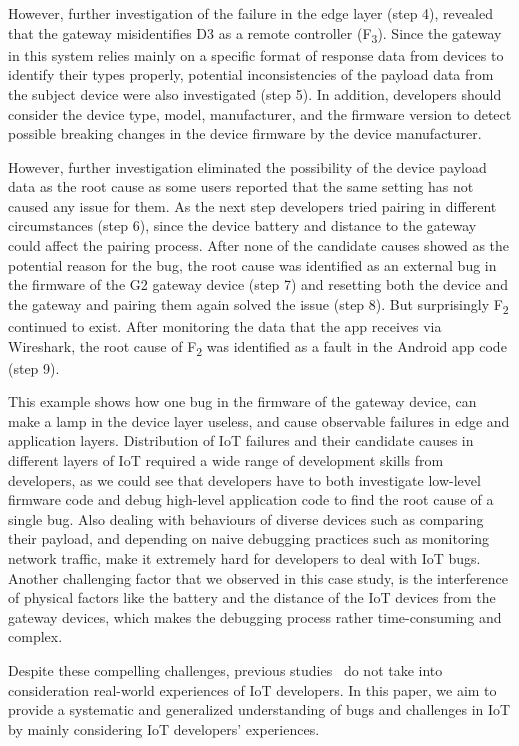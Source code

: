 However, further investigation of the failure in the edge layer (step 4), revealed that the gateway misidentifies D3 as a remote controller (F\textsubscript{3}). Since the gateway in this system relies mainly on a specific format of response data from devices to identify their types properly, potential inconsistencies of the payload data from the subject device were also investigated (step 5). In addition, developers should consider the device type, model, manufacturer, and the firmware version to detect possible breaking changes in the device firmware by the device manufacturer. 

However, further investigation eliminated the possibility of the device payload data as the root cause as some users reported that the same setting has not caused any issue for them. As the next step developers tried pairing in different circumstances (step 6), since the device battery and distance to the gateway could affect the pairing process. After none of the candidate causes showed as the potential reason for the bug, the root cause was identified as an external bug in the firmware of the G2 gateway device (step 7) and resetting both the device and the gateway and pairing them again solved the issue (step 8). But surprisingly F\textsubscript{2} continued to exist. After monitoring the data that the app receives via Wireshark, the root cause of F\textsubscript{2} was identified as a fault in the Android app code (step 9).

This example shows how one bug in the firmware of the gateway device, can make a lamp in the device layer useless, and cause observable failures in edge and application layers. Distribution of IoT failures and their candidate causes in different layers of IoT required a wide range of development skills from developers, as we could see that developers have to both investigate low-level firmware code and debug high-level application code to find the root cause of a single bug. Also dealing with behaviours of diverse devices such as comparing their payload, and depending on naive debugging practices such as monitoring network traffic, make it extremely hard for developers to deal with IoT bugs. Another challenging factor that we observed in this case study, is the interference of physical factors like the battery and the distance of the IoT devices from the gateway devices, which makes the debugging process rather time-consuming and complex.

Despite these compelling challenges, previous studies~\cite{hnat2011hitchhiker,corno2019challenges,stojkoska2017review,chen2017application,IoTOSBugs} do not take into consideration real-world experiences of IoT developers. In this paper, we aim to provide a systematic and generalized understanding of bugs and challenges in IoT by mainly considering IoT developers' experiences.

\endinput

